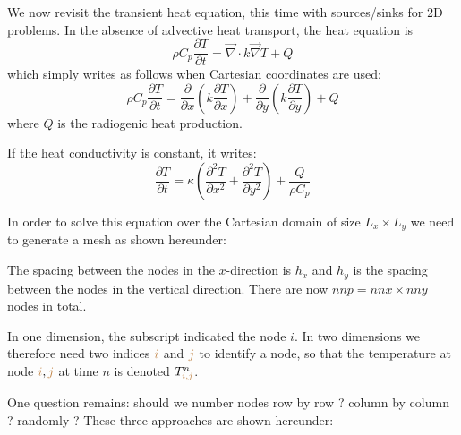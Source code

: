 We now revisit the transient heat equation, this time with sources/sinks for 2D problems.
In the absence of advective heat transport, the heat equation is 
\[
\rho C_p \frac{\partial T}{\partial t} =
\vec\nabla \cdot k \vec\nabla T + Q 
\]
which simply writes as follows when Cartesian coordinates are used:
\[
\rho C_p \frac{\partial T}{\partial t} = 
\frac{\partial }{\partial x} \left(  k  \frac{\partial T}{\partial x} \right)+
\frac{\partial }{\partial y} \left(  k  \frac{\partial T}{\partial y} \right)+
Q
\]
where $Q$ is the radiogenic heat production.

If the heat conductivity is constant, it writes:
\[
\frac{\partial T}{\partial t} =
\kappa \left(  \frac{\partial^2 T}{\partial x^2} +   \frac{\partial^2 T}{\partial y^2} \right)+
\frac{Q}{\rho C_p}
\]

In order to solve this equation over the Cartesian domain of size $L_x \times L_y$
we need to generate a mesh as shown hereunder:


\begin{minipage}[t]{\textwidth}
\begin{center}

\end{center}
\end{minipage}

The spacing between the nodes in the $x$-direction is $h_x$ and $h_y$ is the spacing
between the nodes in the vertical direction. There are now $nnp=nnx\times nny$ nodes in total.

In one dimension, the subscript indicated the node $i$. In two dimensions we therefore 
need two indices ${\color{brown}i}$ and ${\color{brown}j}$ 
to identify a node, so that the temperature at node ${\color{brown}i},{\color{brown}j}$ 
at time $n$ is denoted $T_{{\color{brown}i,j}}^n$.

One question remains: should we number nodes 
row by row ? column by column ? randomly ? 
These three approaches are shown hereunder: 

\vspace{.5cm}

\begin{minipage}[t]{\textwidth}
\\
\end{minipage}

\vspace{.5cm}

